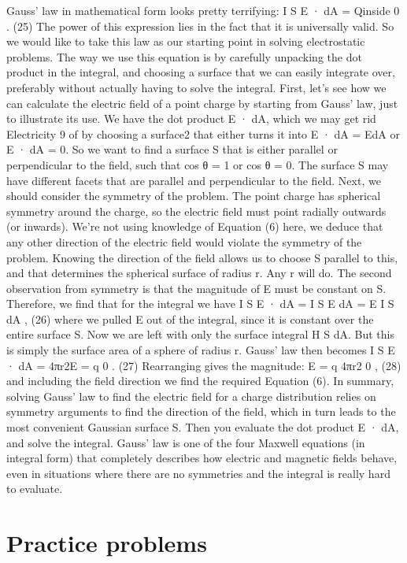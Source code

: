 \documentclass[
  letterpaper,
  DIV=11,
  numbers=noendperiod]{scrreprt}
\begin{document}
Gauss' law in mathematical form looks pretty terrifying: I S E · dA =
Qinside 0 . (25) The power of this expression lies in the fact that it
is universally valid. So we would like to take this law as our starting
point in solving electrostatic problems. The way we use this equation is
by carefully unpacking the dot product in the integral, and choosing a
surface that we can easily integrate over, preferably without actually
having to solve the integral. First, let's see how we can calculate the
electric field of a point charge by starting from Gauss' law, just to
illustrate its use. We have the dot product E · dA, which we may get rid
Electricity 9 of by choosing a surface2 that either turns it into E · dA
= EdA or E · dA = 0. So we want to find a surface S that is either
parallel or perpendicular to the field, such that cos θ = 1 or cos θ =
0. The surface S may have different facets that are parallel and
perpendicular to the field. Next, we should consider the symmetry of the
problem. The point charge has spherical symmetry around the charge, so
the electric field must point radially outwards (or inwards). We're not
using knowledge of Equation (6) here, we deduce that any other direction
of the electric field would violate the symmetry of the problem. Knowing
the direction of the field allows us to choose S parallel to this, and
that determines the spherical surface of radius r. Any r will do. The
second observation from symmetry is that the magnitude of E must be
constant on S. Therefore, we find that for the integral we have I S E ·
dA = I S E dA = E I S dA , (26) where we pulled E out of the integral,
since it is constant over the entire surface S. Now we are left with
only the surface integral H S dA. But this is simply the surface area of
a sphere of radius r. Gauss' law then becomes I S E · dA = 4πr2E = q 0 .
(27) Rearranging gives the magnitude: E = q 4πr2 0 , (28) and including
the field direction we find the required Equation (6). In summary,
solving Gauss' law to find the electric field for a charge distribution
relies on symmetry arguments to find the direction of the field, which
in turn leads to the most convenient Gaussian surface S. Then you
evaluate the dot product E · dA, and solve the integral. Gauss' law is
one of the four Maxwell equations (in integral form) that completely
describes how electric and magnetic fields behave, even in situations
where there are no symmetries and the integral is really hard to
evaluate.

\section{Practice problems}\label{practice-problems-6}
\end{document}
